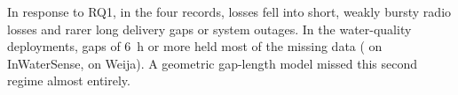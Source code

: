In response to RQ1, in the four records, losses fell into short, weakly bursty radio losses and rarer long delivery gaps or system outages. In the water-quality deployments, gaps of 6~h or more held most of the missing data (\inwsSixLost{} on InWaterSense, \weijaCondSixLost{} on Weija). A geometric gap-length model missed this second regime almost entirely.
